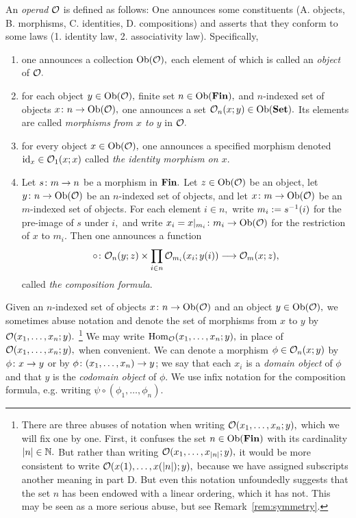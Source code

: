 \documentclass[../main/CT4S-EN-RU]{subfiles}
\begin{document}
\begin{blockRUS}
\end{blockRUS}

\begin{definitionENG}\label{def:operad}
An {\em operad} $\mathcal{O}$ is defined as follows: One announces some constituents (A. objects, B. morphisms, C. identities, D. compositions) and asserts that they conform to some laws (1. identity law, 2. associativity law). Specifically, 
\begin{enumerate}[\hsp A.]
\item one announces a collection $\operatorname{Ob}(\mathcal{O}),$ each element of which is called an {\em object} of $\mathcal{O}.$
\item for each object $y\in\operatorname{Ob}(\mathcal{O}),$ finite set $n\in\operatorname{Ob}({\mathbf{Fin}}),$ and $n$-indexed set of objects $x\colon n\rightarrow\operatorname{Ob}(\mathcal{O}),$ one announces a set $\mathcal{O}_n(x;y)\in\operatorname{Ob}({\mathbf{Set}}).$ Its elements are called {\em morphisms from $x$ to $y$} in $\mathcal{O}.$ 
\item for every object $x\in\operatorname{Ob}(\mathcal{O}),$ one announces a specified morphism denoted $\operatorname{id}_x\in\mathcal{O}_1(x;x)$ called {\em the identity morphism on $x$}.
\item Let $s\colon m\rightarrow n$ be a morphism in ${\mathbf{Fin}}.$ Let $z\in\operatorname{Ob}(\mathcal{O})$ be an object, let $y\colon n\rightarrow\operatorname{Ob}(\mathcal{O})$ be an $n$-indexed set of objects, and let $x\colon m\rightarrow\operatorname{Ob}(\mathcal{O})$ be an $m$-indexed set of objects. For each element $i\in n,$ write $m_i:=s^\m1(i)$ for the pre-image of $s$ under $i,$ and write $x_i=x|_{m_i}\colon m_i\rightarrow\operatorname{Ob}(\mathcal{O})$ for the restriction of $x$ to $m_i.$ Then one announces a function 
\begin{align}\label{dia:composition formula}
\circ\colon\mathcal{O}_n(y;z)\times\prod_{i\in n}\mathcal{O}_{m_i}(x_i;y(i))\longrightarrow\mathcal{O}_{m}(x;z),
\end{align} 
called {\em the composition formula}.
\end{enumerate}
Given an $n$-indexed set of objects $x\colon n\rightarrow\operatorname{Ob}(\mathcal{O})$ and an object $y\in\operatorname{Ob}(\mathcal{O}),$ we sometimes abuse notation and denote the set of morphisms from $x$ to $y$ by $\mathcal{O}(x_1,\ldots,x_n;y).$
\footnote{There are three abuses of notation when writing $\mathcal{O}(x_1,\ldots,x_n;y),$ which we will fix one by one. First, it confuses the set $n\in\operatorname{Ob}({\mathbf{Fin}})$ with its cardinality $|n|\in{\mathbb N}.$ But rather than writing $\mathcal{O}(x_1,\ldots,x_{|n|};y),$ it would be more consistent to write $\mathcal{O}(x(1),\ldots,x(|n|);y),$ because we have assigned subscripts another meaning in part D. But even this notation unfoundedly suggests that the set $n$ has been endowed with a linear ordering, which it has not. This may be seen as a more serious abuse, but see Remark~\ref{rem:symmetry}.}
We may write $\operatorname{Hom}_\mathcal{O}(x_1,\ldots,x_n;y),$ in place of $\mathcal{O}(x_1,\ldots,x_n;y),$ when convenient. We can denote a morphism $\phi\in\mathcal{O}_n(x;y)$ by $\phi\colon x\rightarrow y$ or by $\phi\colon (x_1,\ldots,x_n)\rightarrow y$; we say that each $x_i$ is a {\em domain object} of $\phi$ and that $y$ is the {\em codomain object} of $\phi.$ We use infix notation for the composition formula, e.g. writing $\psi\circ(\phi_1,\ldots,\phi_n).$


\end{definitionENG}
\end{document}
